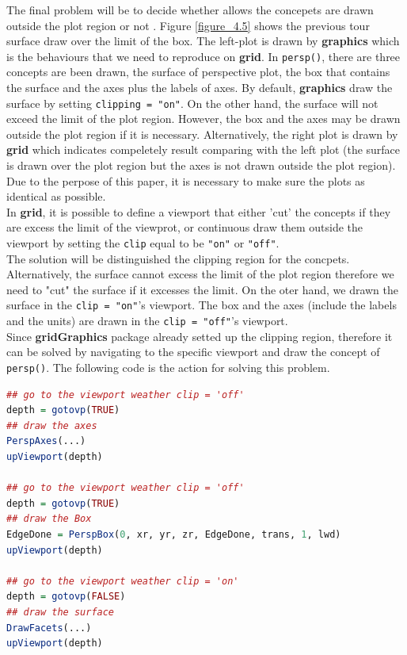 \documentclass[paper=a4, fontsize=11pt]{report}
\begin{document}
The final problem will be to decide whether allows the concepets are drawn outside the plot region or not . Figure \ref{figure_4.5} shows the previous tour surface draw over the limit of the box. The left-plot is drawn by \textbf{graphics} which is the behaviours that we need to reproduce on \textbf{grid}. In \texttt{persp()}, there are three concepts are been drawn, the surface of perspective plot, the box that contains the surface and the axes plus the labels of axes. By default, \textbf{graphics} draw the surface by setting \texttt{clipping = "on"}. On the other hand, the surface will not exceed the limit of the plot region. However, the box and the axes may be drawn outside the plot region if it is necessary. Alternatively, the right plot is drawn by \textbf{grid} which indicates compeletely result comparing with the left plot (the surface is drawn over the plot region but the axes is not drawn outside the plot region). Due to the perpose of this paper, it is necessary to make sure the plots as identical as possible.\\
In \textbf{grid}, it is possible to define a viewport that either 'cut' the concepts if they are excess the limit of the viewprot, or continuous draw them outside the viewport by setting the \texttt{clip} equal to be \texttt{"on"} or \texttt{"off"}.\\
The solution will be distinguished the clipping region for the concpets. Alternatively, the surface cannot excess the limit of the plot region therefore we need to "cut" the surface if it excesses the limit. On the oter hand, we drawn the surface in the \texttt{clip = "on"}'s viewport. The box and the axes (include the labels and the units) are drawn in the \texttt{clip = "off"}'s viewport.\\
Since \textbf{gridGraphics} package already setted up the clipping region, therefore it can be solved by navigating to the specific viewport and draw the concept of \texttt{persp()}. The following code is the action for solving this problem.
\begin{lstlisting}[language = R]
## go to the viewport weather clip = 'off'
depth = gotovp(TRUE)
## draw the axes
PerspAxes(...)
upViewport(depth)

## go to the viewport weather clip = 'off'
depth = gotovp(TRUE)
## draw the Box
EdgeDone = PerspBox(0, xr, yr, zr, EdgeDone, trans, 1, lwd)
upViewport(depth)

## go to the viewport weather clip = 'on'
depth = gotovp(FALSE)
## draw the surface
DrawFacets(...)
upViewport(depth)
\end{lstlisting}\\
\end{document}
